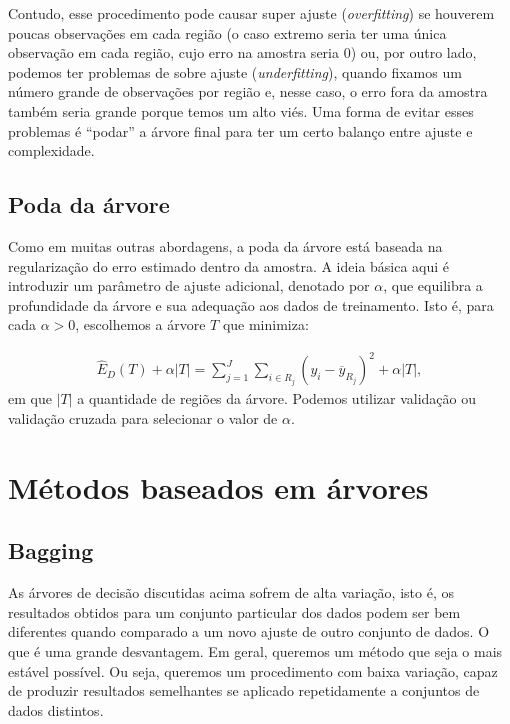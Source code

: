 \documentclass[11pt,]{article}
\begin{document}
Contudo, esse procedimento pode causar super ajuste
(\textit{overfitting}) se houverem poucas observações em cada região (o
caso extremo seria ter uma única observação em cada região, cujo erro na
amostra seria \(0\)) ou, por outro lado, podemos ter problemas de sobre
ajuste (\textit{underfitting}), quando fixamos um número grande de
observações por região e, nesse caso, o erro fora da amostra também
seria grande porque temos um alto viés. Uma forma de evitar esses
problemas é ``podar'' a árvore final para ter um certo balanço entre
ajuste e complexidade.

\hypertarget{poda-da-uxe1rvore}{%
\subsection{Poda da árvore}\label{poda-da-uxe1rvore}}

Como em muitas outras abordagens, a poda da árvore está baseada na
regularização do erro estimado dentro da amostra. A ideia básica aqui é
introduzir um parâmetro de ajuste adicional, denotado por \(\alpha\),
que equilibra a profundidade da árvore e sua adequação aos dados de
treinamento. Isto é, para cada \(\alpha > 0\), escolhemos a árvore \(T\)
que minimiza:

\begin{align}
\widehat{E}_D(T) + \alpha |T| = \sum_{j=1}^J\sum_{i \in R_j}(y_i - \overline{y}_{R_j})^2 + \alpha |T|,
\end{align} em que \(|T|\) a quantidade de regiões da árvore. Podemos
utilizar validação ou validação cruzada para selecionar o valor de
\(\alpha\).

\hypertarget{muxe9todos-baseados-em-uxe1rvores}{%
\section{Métodos baseados em
árvores}\label{muxe9todos-baseados-em-uxe1rvores}}

\hypertarget{bagging}{%
\subsection{Bagging}\label{bagging}}

As árvores de decisão discutidas acima sofrem de alta variação, isto é,
os resultados obtidos para um conjunto particular dos dados podem ser
bem diferentes quando comparado a um novo ajuste de outro conjunto de
dados. O que é uma grande desvantagem. Em geral, queremos um método que
seja o mais estável possível. Ou seja, queremos um procedimento com
baixa variação, capaz de produzir resultados semelhantes se aplicado
repetidamente a conjuntos de dados distintos.
\end{document}
